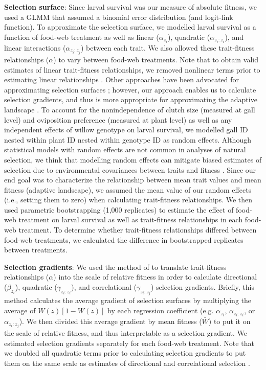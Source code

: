 \documentclass[11pt,]{article}
\begin{document}
\textbf{Selection surface}: Since larval survival was our measure of
absolute fitness, we used a GLMM that assumed a binomial error
distribution (and logit-link function). To approximate the selection
surface, we modelled larval survival as a function of food-web treatment
as well as linear (\(\alpha_{z_i}\)), quadratic (\(\alpha_{z_i:z_i}\)),
and linear interactions (\(\alpha_{z_i:z_j}\)) between each trait. We
also allowed these trait-fitness relationships (\(\alpha\)) to vary
between food-web treatments. Note that to obtain valid estimates of
linear trait-fitness relationships, we removed nonlinear terms prior to
estimating linear relationships \citep{Lande1983}. Other approaches have
been advocated for approximating selection surfaces
\citep{Schluter1988}; however, our approach enables us to calculate
selection gradients, and thus is more appropriate for approximating the
adaptive landscape \citep{Arnold2003}. To account for the
nonindependence of clutch size (measured at gall level) and oviposition
preference (measured at plant level) as well as any independent effects
of willow genotype on larval survival, we modelled gall ID nested within
plant ID nested within genotype ID as random effects. Although
statistical models with random effects are not common in analyses of
natural selection, we think that modelling random effects can mitigate
biased estimates of selection due to environmental covariances between
traits and fitness \citep{Rausher1992}. Since our end goal was to
characterize the relationship between mean trait values and mean fitness
(adaptive landscape), we assumed the mean value of our random effects
(i.e., setting them to zero) when calculating trait-fitness
relationships. We then used parametric bootstrapping (1,000 replicates)
to estimate the effect of food-web treatment on larval survival as well
as trait-fitness relationships in each food-web treatment. To determine
whether trait-fitness relationships differed between food-web
treatments, we calculated the difference in bootstrapped replicates
between treatments.

\textbf{Selection gradients}: We used the method of \citet{Janzen1998}
to translate trait-fitness relationships (\(\alpha\)) into the scale of
relative fitness in order to calculate directional (\(\beta_{z_i}\)),
quadratic (\(\gamma_{z_i:z_i}\)), and correlational
(\(\gamma_{z_i:z_j}\)) selection gradients. Briefly, this method
calculates the average gradient of selection surfaces by multiplying the
average of \(W(z)[1-W(z)]\) by each regression coefficient (e.g.
\(\alpha_{z_i}\), \(\alpha_{z_i:z_i}\), or \(\alpha_{z_i:z_j}\)). We
then divided this average gradient by mean fitness (\(\bar W\)) to put
it on the scale of relative fitness, and thus interpretable as a
selection gradient. We estimated selection gradients separately for each
food-web treatment. Note that we doubled all quadratic terms prior to
calculating selection gradients to put them on the same scale as
estimates of directional and correlational selection
\citep{Stinchcombe2008}.
\end{document}
